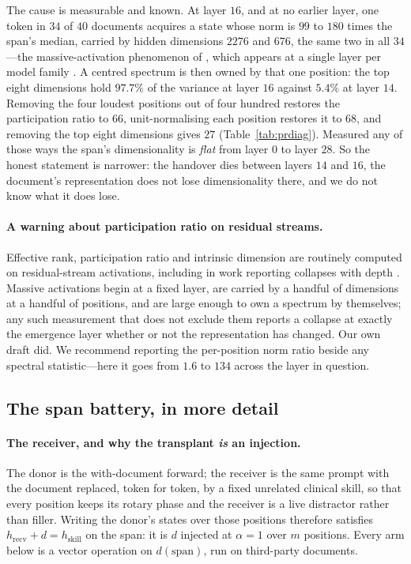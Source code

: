 \documentclass{article}
\newcommand{\dvec}{\ensuremath{d}}
\begin{document}
The cause is measurable and known. At layer $16$, and at no earlier layer, one
token in $34$ of $40$ documents acquires a state whose norm is $99$ to $180$ times the
span's median, carried by hidden dimensions $2276$ and $676$, the same two in
all $34$---the massive-activation phenomenon of \citet{sun2024massive},
which appears at a single layer per model family \citep{shi2026melayer}. A
centred spectrum is then owned by that one position: the top eight dimensions
hold $97.7\%$ of the variance at layer $16$ against $5.4\%$ at layer $14$.
Removing the four loudest positions out of four hundred restores the
participation ratio to $66$, unit-normalising each position restores it to $68$,
and removing the top eight dimensions gives $27$ (Table~\ref{tab:prdiag}).
Measured any of those ways the span's dimensionality is \emph{flat} from layer
$0$ to layer $28$. So the honest statement is narrower: the handover dies
between layers $14$ and $16$, the document's representation does not lose
dimensionality there, and we do not know what it does lose.



\paragraph{A warning about participation ratio on residual streams.} Effective
rank, participation ratio and intrinsic dimension are routinely computed on
residual-stream activations, including in work reporting collapses with depth
\citep{fernando2026residualspectral, sarkar2026causaldim}. Massive activations
begin at a fixed layer, are carried by a handful of dimensions at a handful of
positions, and are large enough to own a spectrum by themselves; any such
measurement that does not exclude them reports a collapse at exactly the
emergence layer whether or not the representation has changed. Our own draft
did. We recommend reporting the per-position norm ratio beside any spectral
statistic---here it goes from $1.6$ to $134$ across the layer in question.




\subsection{The span battery, in more detail}
\label{app:battery2}

\paragraph{The receiver, and why the transplant \emph{is} an injection.} The
donor is the with-document forward; the receiver is the same prompt with the
document replaced, token for token, by a fixed unrelated clinical skill, so that
every position keeps its rotary phase and the receiver is a live distractor
rather than filler. Writing the donor's states over those positions therefore
satisfies $h_{\text{recv}} + \dvec = h_{\text{skill}}$ on the span: it is $\dvec$ injected at $\alpha=1$ over $m$
positions. Every arm below is a vector operation on $\dvec(\text{span})$, run on
third-party documents.
\end{document}
